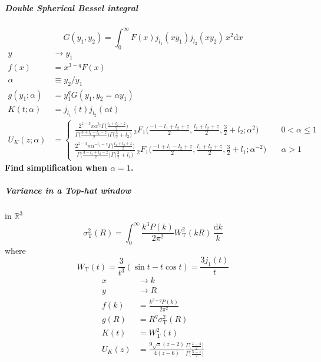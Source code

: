 \documentclass{article}
\renewcommand{\d}{\mathrm{d}}
\newcommand{\Mellin}{U}
\newcommand{\Tophat}{\mathrm{T}}
\begin{document}
\subparagraph{Double Spherical Bessel integral}
\begin{equation}
    G(y_1, y_2) = \int_0^\infty F(x) j_{l_1}(xy_1) j_{l_2}(xy_2) \,x^2\d x
\end{equation}
\begin{align}
    y &\to y_1 \\
    f(x) &= x^{3-q} F(x) \\
    \alpha &\equiv y_2/y_1 \\
    g(y_1; \alpha) &= y_1^q G(y_1, y_2 = \alpha y_1) \\
    K(t; \alpha) &= j_{l_1}(t) j_{l_2}(\alpha t) \\
    \Mellin_K(z; \alpha) &=
    \begin{cases}
        \frac{2^{z-3} \pi \alpha^{l_2} \Gamma\bigl(\frac{l_1+l_2+z}2\bigr)}
            {\Gamma\bigl(\frac{3+l_1-l_2-z}2\bigr) \Gamma\bigl(\frac32+l_2\bigr)}
        \,_2F_1\bigl( \frac{-1-l_1+l_2+z}2, \frac{l_1+l_2+z}2, \frac32+l_2; \alpha^2 \bigr)
        & \quad 0<\alpha\leq1 \\
        \frac{2^{z-3} \pi \alpha^{-l_1-z} \Gamma\bigl(\frac{l_1+l_2+z}2\bigr)}
            {\Gamma\bigl(\frac{3-l_1+l_2-z}2\bigr) \Gamma\bigl(\frac32+l_1\bigr)}
        \,_2F_1\bigl( \frac{-1+l_1-l_2+z}2, \frac{l_1+l_2+z}2, \frac32+l_1; \alpha^{-2} \bigr)
        & \quad \alpha>1
    \end{cases}
\end{align}
\textbf{Find simplification when $\alpha=1$.}


\subparagraph{Variance in a Top-hat window}
in $\mathbb{R}^3$
\begin{equation}
    \sigma_\Tophat^2(R) = \int_0^\infty \frac{k^3P(k)}{2\pi^2} W_\Tophat^2(kR) \,\frac{\d k}k
\end{equation}
where
\begin{equation}
    W_\Tophat(t) = \frac3{t^3}(\sin t - t\cos t) = \frac{3j_1(t)}t
\end{equation}
\begin{align}
    x &\to k \\
    y &\to R \\
    f(k) &= \frac{k^{3-q}P(k)}{2\pi^2} \\
    g(R) &= R^q \sigma_\Tophat^2(R) \\
    K(t) &= W_\Tophat^2(t) \\
    \Mellin_K(z) &= \frac{9\sqrt{\pi}(z-2)}{4(z-6)}
        \frac{\Gamma\bigl(\frac{z-4}2\bigr)}{\Gamma\bigl(\frac{5-z}2\bigr)}
\end{align}
\end{document}
